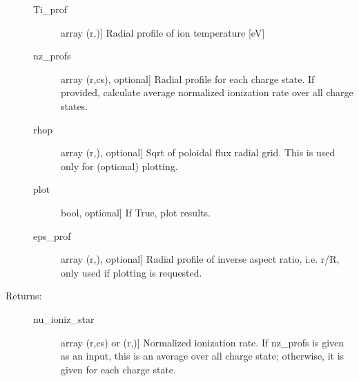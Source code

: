 \documentclass[letterpaper,10pt,english]{sphinxmanual}
\begin{document}
\begin{fulllineitems}
\begin{description}
\begin{description}
\item[{Ti\_prof}] \leavevmode{[}array (r,){]}
Radial profile of ion temperature {[}eV{]}

\item[{nz\_profs}] \leavevmode{[}array (r,cs), optional{]}
Radial profile for each charge state. If provided, calculate average normalized 
ionization rate over all charge states.

\item[{rhop}] \leavevmode{[}array (r,), optional{]}
Sqrt of poloidal flux radial grid. This is used only for (optional) plotting.

\item[{plot}] \leavevmode{[}bool, optional{]}
If True, plot results.

\item[{eps\_prof}] \leavevmode{[}array (r,), optional{]}
Radial profile of inverse aspect ratio, i.e. r/R, only used if plotting is requested.

\end{description}

\item[{Returns:}] \leavevmode\begin{description}
\item[{nu\_ioniz\_star}] \leavevmode{[}array (r,cs) or (r,){]}
Normalized ionization rate. If nz\_profs is given as an input, this is an average over
all charge state; otherwise, it is given for each charge state.

\end{description}

\end{description}

\end{fulllineitems}

\end{document}
